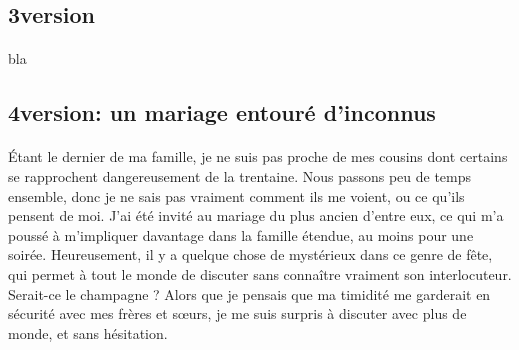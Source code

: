 \subsection{3\ieme version}
\paragraph{}
bla

\subsection{4\ieme version: un mariage entouré d'inconnus}
\paragraph{}
Étant le dernier de ma famille, je ne suis pas proche de mes cousins dont certains se rapprochent dangereusement de la trentaine. Nous passons peu de temps ensemble, donc je ne sais pas vraiment comment ils me voient, ou ce qu’ils pensent de moi. J’ai été invité au mariage du plus ancien d’entre eux, ce qui m’a poussé à m’impliquer davantage dans la famille étendue, au moins pour une soirée. Heureusement, il y a quelque chose de mystérieux dans ce genre de fête, qui permet à tout le monde de discuter sans connaître vraiment son interlocuteur. Serait-ce le champagne ? Alors que je pensais que ma timidité me garderait en sécurité avec mes frères et sœurs, je me suis surpris à discuter avec plus de monde, et sans hésitation.
